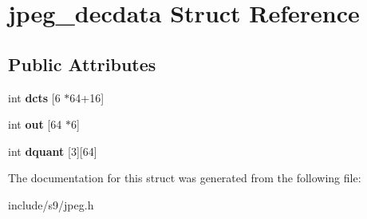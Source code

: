 \hypertarget{structjpeg__decdata}{\section{jpeg\-\_\-decdata \-Struct \-Reference}
\label{structjpeg__decdata}
}
\subsection*{\-Public \-Attributes}
\begin{DoxyCompactItemize}
\item 
\hypertarget{structjpeg__decdata_a165326c644e86f3548801f1d6fae9ec3}{int {\bfseries dcts} \mbox{[}6 $\ast$64+16\mbox{]}}\label{structjpeg__decdata_a165326c644e86f3548801f1d6fae9ec3}

\item 
\hypertarget{structjpeg__decdata_adb74d2eebb2bb629808ed94779612f8f}{int {\bfseries out} \mbox{[}64 $\ast$6\mbox{]}}\label{structjpeg__decdata_adb74d2eebb2bb629808ed94779612f8f}

\item 
\hypertarget{structjpeg__decdata_a18f535c0ce912b8e9d04aa4aed9c4d1c}{int {\bfseries dquant} \mbox{[}3\mbox{]}\mbox{[}64\mbox{]}}\label{structjpeg__decdata_a18f535c0ce912b8e9d04aa4aed9c4d1c}

\end{DoxyCompactItemize}


\-The documentation for this struct was generated from the following file\-:\begin{DoxyCompactItemize}
\item 
include/s9/jpeg.\-h\end{DoxyCompactItemize}
